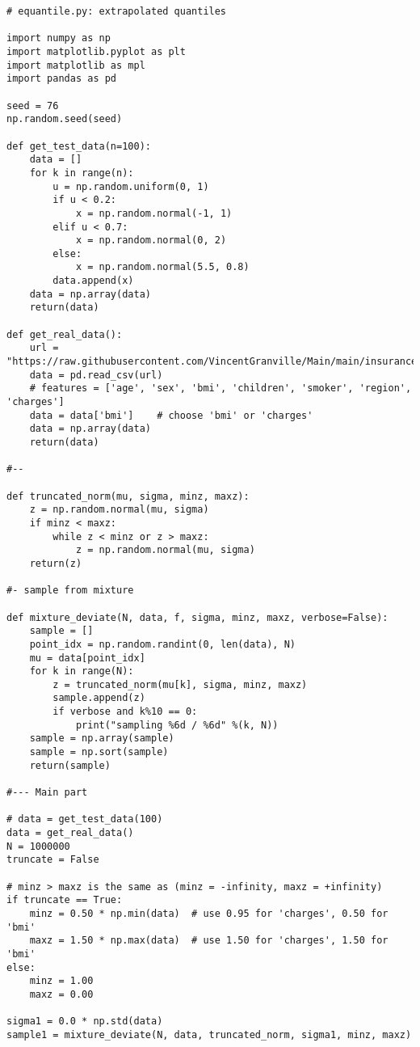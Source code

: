 \documentclass[oneside,10pt]{book}
\begin{document}


\begin{lstlisting}
# equantile.py: extrapolated quantiles

import numpy as np
import matplotlib.pyplot as plt
import matplotlib as mpl
import pandas as pd

seed = 76
np.random.seed(seed)

def get_test_data(n=100):
    data = []
    for k in range(n):
        u = np.random.uniform(0, 1)
        if u < 0.2:
            x = np.random.normal(-1, 1)
        elif u < 0.7:
            x = np.random.normal(0, 2)
        else:
            x = np.random.normal(5.5, 0.8)
        data.append(x)
    data = np.array(data)
    return(data)

def get_real_data():
    url = "https://raw.githubusercontent.com/VincentGranville/Main/main/insurance.csv"
    data = pd.read_csv(url)
    # features = ['age', 'sex', 'bmi', 'children', 'smoker', 'region', 'charges']
    data = data['bmi']    # choose 'bmi' or 'charges'
    data = np.array(data)
    return(data)

#--

def truncated_norm(mu, sigma, minz, maxz):
    z = np.random.normal(mu, sigma)
    if minz < maxz:
        while z < minz or z > maxz:
            z = np.random.normal(mu, sigma)
    return(z)

#- sample from mixture

def mixture_deviate(N, data, f, sigma, minz, maxz, verbose=False):
    sample = []
    point_idx = np.random.randint(0, len(data), N)
    mu = data[point_idx]
    for k in range(N):
        z = truncated_norm(mu[k], sigma, minz, maxz)
        sample.append(z)
        if verbose and k%10 == 0:
            print("sampling %6d / %6d" %(k, N))
    sample = np.array(sample)
    sample = np.sort(sample)
    return(sample)

#--- Main part

# data = get_test_data(100)
data = get_real_data()
N = 1000000
truncate = False

# minz > maxz is the same as (minz = -infinity, maxz = +infinity)
if truncate == True:
    minz = 0.50 * np.min(data)  # use 0.95 for 'charges', 0.50 for 'bmi'
    maxz = 1.50 * np.max(data)  # use 1.50 for 'charges', 1.50 for 'bmi'
else:
    minz = 1.00
    maxz = 0.00

sigma1 = 0.0 * np.std(data)
sample1 = mixture_deviate(N, data, truncated_norm, sigma1, minz, maxz)


\end{lstlisting}
\end{document}
